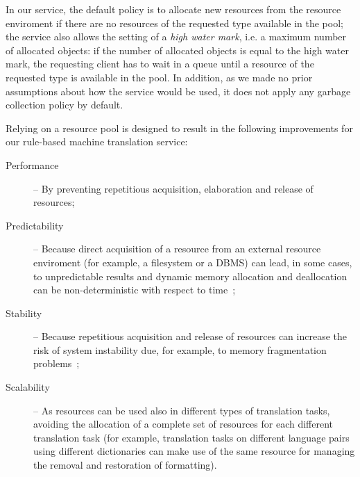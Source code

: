 \documentclass[11pt]{article}
\begin{document}
In our service, the default policy is to allocate new resources from the resource enviroment if there are no resources of the requested type available in the pool; the service also allows the setting of a \emph{high water mark}, i.e. a maximum number of allocated objects: if the number of allocated objects is equal to the high water mark, the requesting client has to wait in a queue until a resource of the requested type is available in the pool. In addition, as we made no prior assumptions about how the service would be used, it does not apply any garbage collection policy by default.

Relying on a resource pool is designed to result in the following improvements for our rule-based machine translation service:

\begin{description}
 \item[Performance] -- By preventing repetitious acquisition, elaboration and release of resources;
 \item[Predictability] -- Because direct acquisition of a resource from an external resource enviroment (for example, a filesystem or a DBMS) can lead, in some cases, to unpredictable results and dynamic memory allocation and deallocation can be non-deterministic with respect to time~\citep{realtime};
 \item[Stability] -- Because repetitious acquisition and release of resources can increase the risk of system instability due, for example, to memory fragmentation problems~\citep{robust, realtime};  %



 \item[Scalability] -- As resources can be used also in different types of translation tasks, avoiding the allocation of a complete set of resources for each different translation task (for example, translation tasks on different language pairs using different dictionaries can make use of the same resource for managing the removal and restoration of formatting).
\end{description}
\end{document}

